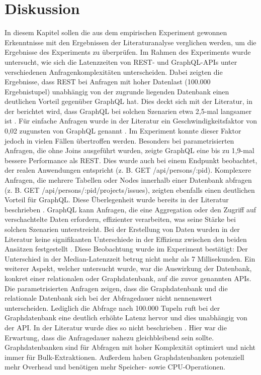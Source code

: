 \chapter{Diskussion} %
\label{sec:diskussion}
In diesem Kapitel sollen die aus dem empirischen Experiment gewonnen Erkenntnisse mit den Ergebnissen der Literaturanalyse verglichen werden, um die Ergebnisse des Experiments zu überprüfen.
\newline
\noindent
Im Rahmen des Experiments wurde untersucht, wie sich die Latenzzeiten von REST- und GraphQL-APIs unter verschiedenen Anfragenkomplexitäten unterscheiden. Dabei zeigten die Ergebnisse, dass REST bei Anfragen mit hoher Datenlast (100.000 Ergebnistupel) unabhängig von der zugrunde liegenden Datenbank einen deutlichen Vorteil gegenüber GraphQL hat. Dies deckt sich mit der Literatur, in der berichtet wird, dass GraphQL bei solchen Szenarien etwa 2,5-mal langsamer ist \citep{restvsgraphql}.
\newline
\noindent
Für einfache Anfragen wurde in der Literatur ein Geschwindigkeitsfaktor von 0,02 zugunsten von GraphQL genannt \citep{migrategraphql}. Im Experiment konnte dieser Faktor jedoch in vielen Fällen übertroffen werden. Besonders bei parametrisierten Anfragen, die ohne Joins ausgeführt wurden, zeigte GraphQL eine bis zu 1,9-mal bessere Performance als REST. Dies wurde auch bei einem Endpunkt beobachtet, der realen Anwendungen entspricht (z. B. GET /api/persons/:pid).
\newline
\noindent
Komplexere Anfragen, die mehrere Tabellen oder Nodes innerhalb einer Datenbank abfragen (z. B. GET /api/persons/:pid/projects/issues), zeigten ebenfalls einen deutlichen Vorteil für GraphQL. Diese Überlegenheit wurde bereits in der Literatur beschrieben \citep{graphqlreplacerest}. GraphQL kann Anfragen, die eine Aggregation oder den Zugriff auf verschachtelte Daten erfordern, effizienter verarbeiten, was seine Stärke bei solchen Szenarien unterstreicht.
\newline
\noindent
Bei der Erstellung von Daten wurden in der Literatur keine signifikanten Unterschiede in der Effizienz zwischen den beiden Ansätzen festgestellt \citep{graphqlreplacerest}. Diese Beobachtung wurde im Experiment bestätigt: Der Unterschied in der Median-Latenzzeit betrug nicht mehr als 7 Millisekunden.
\newline
\noindent
Ein weiterer Aspekt, welcher untersucht wurde, war die Auswirkung der Datenbank, konkret einer relationalen oder Graphdatenbank, auf die zuvor genannten APIs. Die parametrisierten Anfragen zeigen, dass die Graphdatenbank und die relationale Datenbank sich bei der Abfragedauer nicht nennenswert unterscheiden. Lediglich die Abfrage nach 100.000 Tupeln ruft bei der Graphdatenbank eine deutlich erhöhte Latenz hervor und dies unabhängig von der API. In der Literatur wurde dies so nicht beschrieben \citep{graphrelationaldb}. Hier war die Erwartung, dass die Anfragedauer nahezu gleichbleibend sein sollte. Graphdatenbanken sind für Abfragen mit hoher Komplexität optimiert und nicht immer für Bulk-Extraktionen. Außerdem haben Graphdatenbanken potenziell mehr Overhead und benötigen mehr Speicher- sowie CPU-Operationen.
